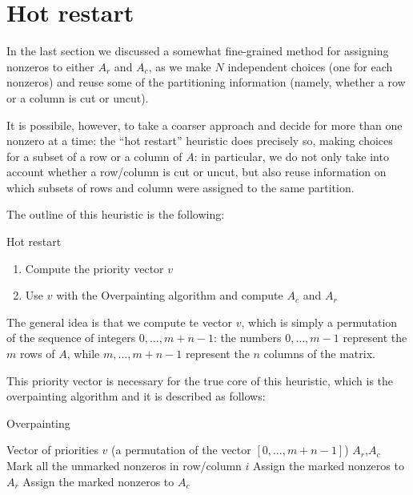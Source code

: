 \section{Hot restart}

In the last section we discussed a somewhat fine-grained method for assigning nonzeros to either $A_r$ and $A_c$, as we make $N$ independent choices (one for each nonzeros) and reuse some of the partitioning information (namely, whether a row or a column is cut or uncut).

It is possibile, however, to take a coarser approach and decide for more than one nonzero at a time: the ``hot restart'' heuristic does precisely so, making choices for a subset of a row or a column of $A$: in particular, we do not only take into account whether a row/column is cut or uncut, but also reuse information on which subsets of rows and column were assigned to the same partition.

The outline of this heuristic is the following:

\begin{algorithm}[H]
 \caption{Hot restart}
 \begin{enumerate}[(1)]
  \item Compute the priority vector $v$
  \item Use $v$ with the Overpainting algorithm and compute $A_c$ and $A_r$
 \end{enumerate}
\end{algorithm}

The general idea is that we compute te vector $v$, which is simply a permutation of the sequence of integers $0,\dots,m+n-1$: the numbers $0,\dots,m-1$ represent the $m$ rows of $A$, while $m,\dots,m+n-1$ represent the $n$ columns of the matrix.

This priority vector is necessary for the true core of this heuristic, which is the overpainting algorithm and it is described  as follows:

\begin{algorithm}[H]
\caption{Overpainting} \label{alg:overpainting}
\begin{algorithmic}
\STATE
\REQUIRE Vector of priorities $v$ (a permutation of the vector $[0,\dots,m+n-1]$)
\ENSURE $A_r$,$A_c$
\STATE
{}
\STATE Mark all the unmarked nonzeros in row/column $i$
\STATE Assign the marked nonzeros to $A_r$
\ELSE
\STATE Assign the marked nonzeros to $A_c$
\ENDIF
\ENDFOR
\end{algorithmic}
\end{algorithm}

